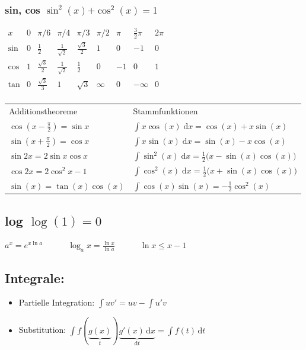 \documentclass[6pt,a4paper]{scrartcl}
\newcommand{\bs}[1]{\ensuremath{\boldsymbol{#1}}}								%
\newcommand{\diff}{\ensuremath{\;\mathrm d}}									%
\begin{document}
\begin{multicols}{4}

\subsubsection{sin, cos \quad $\sin^2(x) \bs + \cos^2(x) = 1$}
$\begin{array}{c|c|c|c|c|c|c|c|c}
x & 0 & \pi / 6 & \pi / 4 & \pi / 3 & \pi / 2 & \pi & \frac{3}{2}\pi & 2 \pi \\ \hline
\sin & 0 & \frac{1}{2} & \frac{1}{\sqrt{2}} & \frac{\sqrt 3}{2} & 1 & 0 & -1 & 0 \\
\cos & 1 & \frac{\sqrt 3}{2} & \frac{1}{\sqrt 2} & \frac{1}{2} & 0 & -1 & 0 & 1 \\     
\tan & 0 & \frac{\sqrt{3}}{3}&	1				 &	\sqrt{3} & \infty & 0 & - \infty & 0\\
\end{array}$ 
\begin{tabular}{l  l} 
	Additionstheoreme &  Stammfunktionen\\
 	$\cos (x - \frac{\pi}{2}) = \sin x$ & $\int x \cos(x) \diff x = \cos(x) + x \sin(x)$\\
 	
 	 $\sin (x + \frac{\pi}{2}) = \cos x$ & $\int x \sin(x) \diff x = \sin(x) - x \cos(x)$\\
 	
 	$\sin 2x = 2 \sin x \cos x $  & $\int \sin^2(x) \diff x = \frac12 \bigl(x - \sin(x)\cos(x) \bigr)$\\
     
 	$\cos 2x = 2\cos^2 x - 1$  & $\int \cos^2(x) \diff x = \frac12 \bigl(x + \sin(x)\cos(x) \bigr)$\\

 	$\sin(x) = \tan(x)\cos(x)$ & $\int \cos(x)\sin(x) = -\frac12 \cos^2(x)$ \\
\end{tabular}

\subsection{log \quad $\log(1) = 0$}
$a^x = e^{x \ln a} \qquad \quad \log_a x = \frac{\ln x}{\ln a} \qquad \quad \ln x \le x -1$

\subsection{Integrale:}
\begin{itemize}\itemsep-1pt
\item Partielle Integration: $\int uv'=uv-\int u'v$
\item Substitution: $\int f(\underbrace {g(x)}_{t}) \underbrace {g'(x)\,\mathrm dx}_{\mathrm dt}=\int f(t)\, \mathrm dt$
\end{itemize}


\end{multicols}
\end{document}
